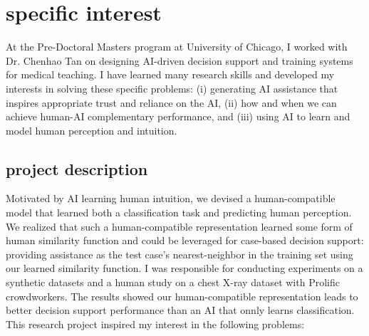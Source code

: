 
\section{specific interest}


At the Pre-Doctoral Masters program at University of Chicago, I worked with Dr. Chenhao Tan on designing AI-driven decision support and training systems for medical teaching. I have learned many research skills and developed my interests in solving these specific problems:
(i) generating AI assistance that inspires appropriate trust and reliance on the AI, 
(ii) how and when we can achieve human-AI complementary performance, and 
(iii) using AI to learn and model human perception and intuition.



\subsection{project description}
Motivated by AI learning human intuition, we devised a human-compatible model that learned both a classification task and predicting human perception. We realized that such a human-compatible representation learned some form of human similarity function and could be leveraged for case-based decision support: providing assistance as the test case's nearest-neighbor in the training set using our learned similarity function.
I was responsible for conducting experiments on a synthetic datasets and a human study on a chest X-ray dataset with Prolific crowdworkers. The results showed our human-compatible representation leads to better decision support performance than an AI that onnly learns classification.  
This research project inspired my interest in the following problems: 




